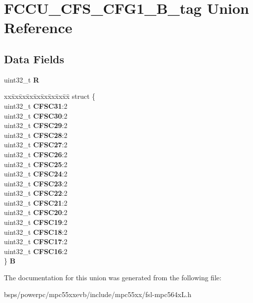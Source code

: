 \hypertarget{unionFCCU__CFS__CFG1__32B__tag}{}\section{F\+C\+C\+U\+\_\+\+C\+F\+S\+\_\+\+C\+F\+G1\+\_\+B\+\_\+tag Union Reference}
\label{unionFCCU__CFS__CFG1__32B__tag}
\subsection*{Data Fields}
\begin{DoxyCompactItemize}
\item 
\mbox{\label{unionFCCU__CFS__CFG1__32B__tag_a200277e0d4501edd3700d161fee2f4d7}} 
uint32\+\_\+t {\bfseries R}
\item 
\mbox{\label{unionFCCU__CFS__CFG1__32B__tag_ae40cbcc03cc39330e48f8b8f3b98e01d}} 
\begin{tabbing}
xx\=xx\=xx\=xx\=xx\=xx\=xx\=xx\=xx\=\kill
struct \{\\
\>uint32\_t {\bfseries CFSC31}:2\\
\>uint32\_t {\bfseries CFSC30}:2\\
\>uint32\_t {\bfseries CFSC29}:2\\
\>uint32\_t {\bfseries CFSC28}:2\\
\>uint32\_t {\bfseries CFSC27}:2\\
\>uint32\_t {\bfseries CFSC26}:2\\
\>uint32\_t {\bfseries CFSC25}:2\\
\>uint32\_t {\bfseries CFSC24}:2\\
\>uint32\_t {\bfseries CFSC23}:2\\
\>uint32\_t {\bfseries CFSC22}:2\\
\>uint32\_t {\bfseries CFSC21}:2\\
\>uint32\_t {\bfseries CFSC20}:2\\
\>uint32\_t {\bfseries CFSC19}:2\\
\>uint32\_t {\bfseries CFSC18}:2\\
\>uint32\_t {\bfseries CFSC17}:2\\
\>uint32\_t {\bfseries CFSC16}:2\\
\} {\bfseries B}\\

\end{tabbing}\end{DoxyCompactItemize}


The documentation for this union was generated from the following file\+:\begin{DoxyCompactItemize}
\item 
bsps/powerpc/mpc55xxevb/include/mpc55xx/fsl-\/mpc564x\+L.\+h\end{DoxyCompactItemize}
